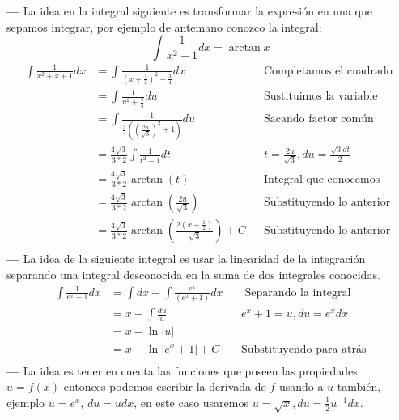 \documentclass[14pt]{extarticle}
\begin{document}
    \textbf{---} La idea en la integral siguiente es transformar la expresión en una que sepamos integrar, por ejemplo de antemano conozco la integral: $$\int \frac{1}{x^2+1}dx = \arctan{x}$$
            \begin{align}
                  \int \frac{1}{x^2+x+1} dx
                   & = \int \frac{1}{(x+\frac{1}{2})^2+\frac{3}{4}}dx                           &  & \text{Completamos el cuadrado }                             \\
                   & = \int \frac{1}{u^2+\frac{3}{4}}du                                         &  & \text{Sustituimos la variable}                              \\
                   & = \int \frac{1}{ \frac{3}{4} \left( (\frac{2u}{\sqrt 3})^2 + 1 \right) }du &  & \text{Sacando factor común}                                 \\
                   & = \frac{4\sqrt{3}}{3*2} \int \frac{1}{t^2+1}dt                             &  & \text{$t = \frac{2u}{\sqrt{3}}, du = \frac{\sqrt{3}dt}{2}$} \\
                   & = \frac{4\sqrt{3}}{3*2} \arctan(t)                                         &  & \text{Integral que conocemos}                               \\
                   & = \frac{4\sqrt{3}}{3*2} \arctan(\frac{2u}{\sqrt{3}})                       &  & \text{Substituyendo lo anterior}                            \\
                   & =  \frac{4\sqrt{3}}{3*2} \arctan(\frac{2(x+\frac{1}{2})}{\sqrt{3}}) + C    &  & \text{Substituyendo lo anterior}                            \\
            \end{align}
    \textbf{---} La idea de la siguiente integral es usar la linearidad de la integración separando una integral desconocida en la suma de dos integrales conocidas.
            \begin{align}
                  \int \frac{1}{e^x+1} dx
                   & = \int dx - \int \frac{e^x}{(e^x+1)}dx &  & \text{ Separando la integral }  \\
                   & = x - \int \frac{du}{u}                &  & \text{$e^x+1 = u, du = e^xdx$}  \\
                   & = x - \ln{\vert u \vert }                                                   \\
                   & = x -  \ln{\vert e^x+1     \vert} + C  &  & \text{Substituyendo para atrás} \\
            \end{align}
    \textbf{---} La idea es tener en cuenta las funciones que poseen las propiedades: $u = f(x)$ entonces podemos escribir la derivada de $f$ usando a $u$ también, ejemplo $u = e^x$, $du = udx$, en este caso usaremos $u = \sqrt{x},  du = \frac{1}{2}u^{-1}dx$.
\end{document}
